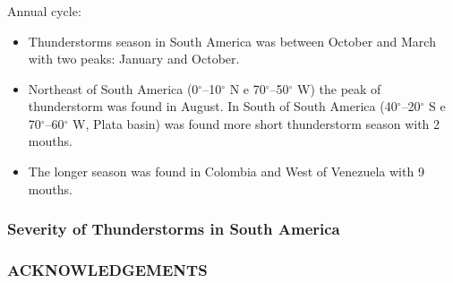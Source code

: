 \documentclass[smaller]{beamer}
\begin{document}
\begin{frame}
\frametitle{}
\Large{Annual cycle:}
\begin{itemize}
\item Thunderstorms season in South America was between October and March with two peaks: January and October.
\item Northeast of South America (0$^{\circ}$--10$^{\circ}$ N e 70$^{\circ}$--50$^{\circ}$ W) the peak of thunderstorm was found in August. In South of South America (40$^{\circ}$--20$^{\circ}$ S e 70$^{\circ}$--60$^{\circ}$ W, Plata basin) was found more short thunderstorm season with 2 mouths.  
\item The longer season was found in Colombia and West of Venezuela with 9 mouths.
\end{itemize}

\end{frame}







\begin{frame}
\frametitle{Severity of Thunderstorms in South America}

\end{frame}


\begin{frame}
\frametitle{ACKNOWLEDGEMENTS}



\end{frame}
\end{document}
